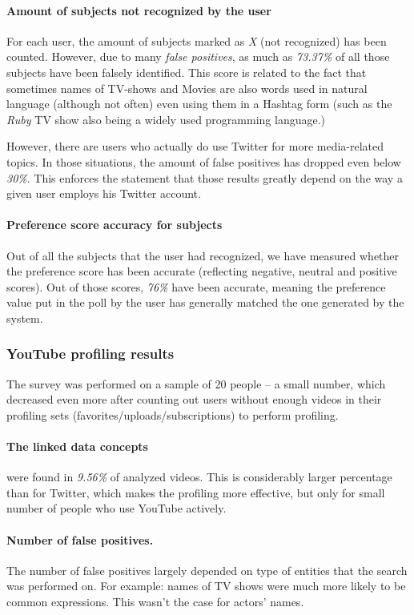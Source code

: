\paragraph{Amount of subjects not recognized by the user}
For each user, the amount of subjects marked as \textit{X} (not recognized) has been counted. However, due to many
\textit{false positives}, as much as \textit{73.37\%} of all those subjects have been falsely identified. This score is
related to the fact that sometimes names of TV-shows and Movies are also words used in natural language (although not
often) even using them in a Hashtag form (such as the \textit{Ruby} TV show also being a widely used programming language.)

However, there are users who actually do use Twitter for more media-related topics. In those situations, the amount of
false positives has dropped even below \textit{30\%}. This enforces the statement that those results greatly depend
on the way a given user employs his Twitter account.

\paragraph{Preference score accuracy for subjects}
Out of all the subjects that the user had recognized, we have measured whether the preference score has been accurate
(reflecting negative, neutral and positive scores). Out of those scores, \textit{76\%} have been accurate, meaning
the preference value put in the poll by the user has generally matched the one generated by the system.

\subsubsection{YouTube profiling results}

The survey was performed on a sample of 20 people -- a small number, which
decreased even more after counting out users without enough videos in their
profiling sets (favorites/uploads/subscriptions) to perform profiling.

\paragraph{The linked data concepts} were found in \textit{9.56\%} of analyzed videos. This
is considerably larger percentage than for Twitter, which makes the profiling
more effective, but only for small number of people who use YouTube actively.

\paragraph{Number of false positives.} The number of false positives largely
depended on type of entities that the search was performed on. For example:
names of TV shows were much more likely to be common expressions. This wasn't
the case for actors' names.
